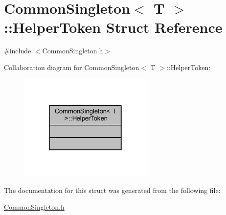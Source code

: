 \hypertarget{struct_common_singleton_1_1_helper_token}{}\section{Common\+Singleton$<$ T $>$\+::Helper\+Token Struct Reference}
\label{struct_common_singleton_1_1_helper_token}


{\ttfamily \#include $<$Common\+Singleton.\+h$>$}



Collaboration diagram for Common\+Singleton$<$ T $>$\+::Helper\+Token\+:
\nopagebreak
\begin{figure}[H]
\begin{center}
\leavevmode
\includegraphics[width=190pt]{struct_common_singleton_1_1_helper_token__coll__graph}
\end{center}
\end{figure}


The documentation for this struct was generated from the following file\+:\begin{DoxyCompactItemize}
\item 
\mbox{\hyperlink{_common_singleton_8h}{Common\+Singleton.\+h}}\end{DoxyCompactItemize}
